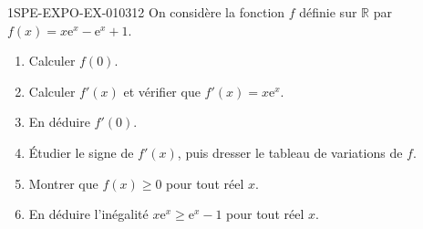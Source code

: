 \begin{exercice}{1SPE-EXPO-EX-010}{3}{12}
On considère la fonction $f$ définie sur $\mathbb{R}$ par $f(x) = x\mathrm{e}^x - \mathrm{e}^x + 1$.
\begin{enumerate}
\item Calculer $f(0)$.
\item Calculer $f'(x)$ et vérifier que $f'(x) = x\mathrm{e}^x$.
\item En déduire $f'(0)$.
\item Étudier le signe de $f'(x)$, puis dresser le tableau de variations de $f$.
\item Montrer que $f(x) \geqslant 0$ pour tout réel $x$.
\item En déduire l'inégalité $x\mathrm{e}^x \geqslant \mathrm{e}^x - 1$ pour tout réel $x$.
\end{enumerate}
\end{exercice}
